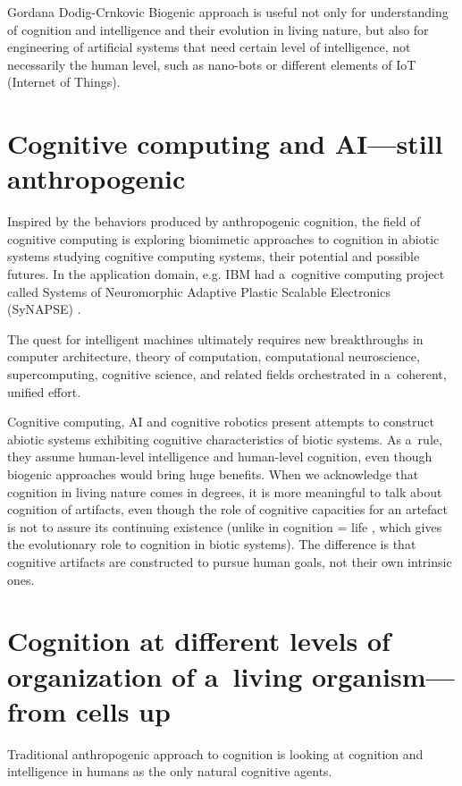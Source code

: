 \begin{artengenv}{Gordana Dodig-Crnkovic}
{}
Biogenic approach is useful not only for understanding of cognition and intelligence and their evolution in living nature, but also for engineering of artificial systems that need certain level of intelligence, not necessarily the human level, such as nano-bots
\parencite[][]{kriegman_kinematic_2021} %
 or different elements of IoT (Internet of Things).

\section*{Cognitive computing and AI---still anthropogenic}
Inspired by the behaviors produced by anthropogenic cognition,
\parencite{modha_cognitive_2011}
the field of cognitive computing is exploring biomimetic approaches to cognition in abiotic systems 
\parencite{gudivada_cognitive_2019}
studying cognitive computing systems, their potential and possible futures. In the application domain, e.g. IBM had a~cognitive computing project called Systems of Neuromorphic Adaptive Plastic Scalable Electronics (SyNAPSE)
\parencite{srinivasa_neuromorphic_2012}.

The quest for intelligent machines ultimately requires new breakthroughs in computer architecture, theory of computation, computational neuroscience, supercomputing, cognitive science, and related fields orchestrated in a~coherent, unified effort.

Cognitive computing, AI and cognitive robotics present attempts to construct abiotic systems exhibiting cognitive characteristics of biotic systems. As a~rule, they assume human-level intelligence and human-level cognition, even though biogenic approaches would bring huge benefits. When we acknowledge that cognition in living nature comes in degrees, it is more meaningful to talk about cognition of artifacts, even though the role of cognitive capacities for an artefact is not to assure its continuing existence (unlike in cognition = life
\parencite[][]{stewart_cognition_1996}, %
 which gives the evolutionary role to cognition in biotic systems). The difference is that cognitive artifacts are constructed to pursue human goals, not their own intrinsic ones.

\section*{Cognition at different levels of organization of a~living organism---from cells up}
Traditional anthropogenic approach to cognition
\parencite[][]{markram_human_2012} %
 is looking at cognition and intelligence in humans as the only natural cognitive agents.


\end{artengenv}
